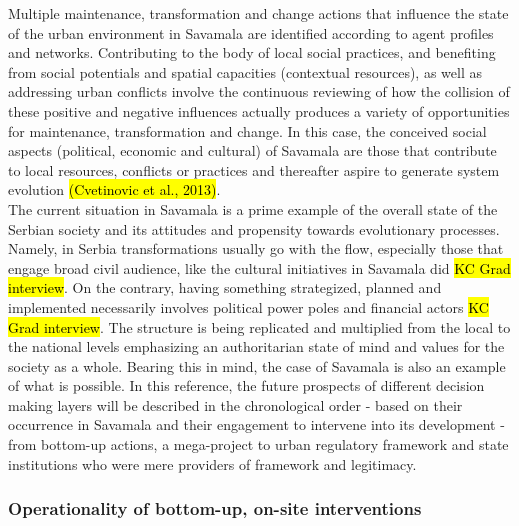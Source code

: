 \documentclass[11pt]{report}
\begin{document}
Multiple maintenance, transformation and change actions that influence the state of the urban environment in Savamala are identified according to agent profiles and networks.
Contributing to the body of local social practices, and benefiting from social potentials and spatial capacities (contextual resources), as well as addressing urban conflicts involve the continuous reviewing of how the collision of these positive and negative influences actually produces a variety of opportunities for maintenance, transformation and change. In this case, the conceived social aspects (political, economic and cultural) of Savamala are those that contribute to local resources, conflicts or practices and thereafter aspire to generate system evolution \hl{(Cvetinovic et al., 2013)}. 
\\
The current situation in Savamala is a prime example of the overall state of the Serbian society and its attitudes and propensity towards evolutionary processes.
Namely, in Serbia transformations usually go with the flow, especially those that engage broad civil audience, like the cultural initiatives in Savamala did \hl{KC Grad interview}.
On the contrary, having something strategized, planned and implemented necessarily involves political power poles and financial actors \hl{KC Grad interview}. The structure is being replicated and multiplied from the local to the national levels emphasizing an authoritarian state of mind and values for the society as a whole.
Bearing this in mind, the case of Savamala is also an example of what is possible. In this reference, the future prospects of different decision making layers will be described in the chronological order - based on their occurrence in Savamala and their engagement to intervene into its development - from bottom-up actions, a mega-project to urban regulatory framework and state institutions who were mere providers of framework and legitimacy. 

\subsubsection{Operationality of bottom-up, on-site interventions}
\end{document}
